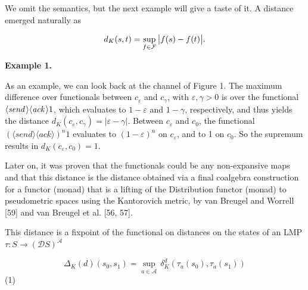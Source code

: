 We omit the semantics, but the next example will give a taste of it. A distance emerged naturally as\par
  
\par  \quad  \[d_{K}(s,t)=\sup_{f\in\cal F}\big|f(s)-f(t)\big|.\]\quad  \quad  
  
 
 
\par\medskip\noindent\textbf{Example 1.}\par
 
 
As an example, we can look back at the channel of Figure 1. The maximum difference over functionals between $c_{\varepsilon}$ and $c_{\gamma}$, with $\varepsilon,\gamma>0$ is over the functional $\langle\textit{send\,}\rangle\langle\textit{ack}\,\rangle 1$, which evaluates to $1-\varepsilon$ and $1-\gamma$, respectively, and thus yields the distance $d_{K}(c_{\varepsilon},c_{\gamma})=|\varepsilon-\gamma|$. Between $c_{\varepsilon}$ and $c_{0}$, the functional $(\langle send\rangle\langle ack\rangle)^{n}1$ evaluates to $(1-\varepsilon)^{n}$ on $c_{\varepsilon}$, and to 1 on $c_{0}$. So the supremum results in $d_{K}(c_{\varepsilon},c_{0})=1$.\par
 
 
 
 
Later on, it was proven that the functionals could be any non-expansive maps and that this distance is the distance obtained via a final coalgebra construction for a functor (monad) that is a lifting of the Distribution functor (monad) to pseudometric spaces using the Kantorovich metric, by van Breugel and Worrell [59] and van Breugel et al. [56, 57].\par
 
 
 
This distance is a fixpoint of the functional on distances on the states of an LMP $\tau:S\to(\mathcal{D}S)^{\mathcal{A}}$\par
  
\par  \quad  \[\Delta_{K}(d)(s_{0},s_{1})=\sup_{a\in\mathcal{A}}\,\delta_{K}^{d}(\tau_{a}(s_{0}),\tau_{a}(s_{1}))\]\quad  \quad  (1)\quad  
  
